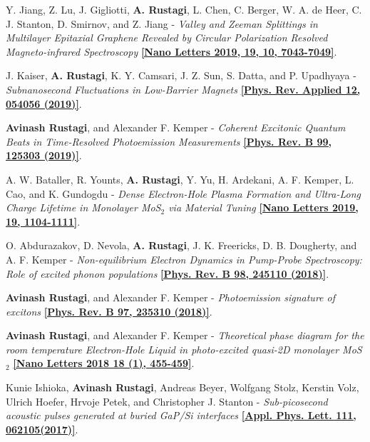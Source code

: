 \documentclass[12pt]{article}
\begin{document}
\begin{etaremune}
\item Y. Jiang, Z. Lu, J. Gigliotti, {\bf A. Rustagi}, L. Chen, C. Berger, W. A. de Heer, C. J. Stanton, D. Smirnov, and Z. Jiang - \textit{Valley and Zeeman Splittings in Multilayer Epitaxial Graphene Revealed by Circular Polarization Resolved Magneto-infrared Spectroscopy} \href{https://doi.org/10.1021/acs.nanolett.9b02505}{\bf [Nano Letters 2019, 19, 10, 7043-7049]}.

\item J. Kaiser, {\bf A. Rustagi}, K. Y. Camsari, J. Z. Sun, S. Datta, and P. Upadhyaya - \textit{Subnanosecond Fluctuations in Low-Barrier Magnets} \href{https://doi.org/10.1103/PhysRevApplied.12.054056}{\bf [Phys. Rev. Applied 12, 054056 (2019)]}.

    \item {\bf Avinash Rustagi}, and Alexander F. Kemper - \textit{Coherent Excitonic Quantum Beats in Time-Resolved Photoemission Measurements} \href{http://doi.org/10.1103/PhysRevB.99.125303}{\bf [Phys. Rev. B 99, 125303 (2019)]}.

    \item A. W. Bataller, R. Younts, {\bf A. Rustagi}, Y. Yu,  H. Ardekani, A. F. Kemper, L. Cao, and K. Gundogdu - \textit{Dense Electron-Hole Plasma Formation and Ultra-Long Charge Lifetime in Monolayer MoS$_2$ via Material Tuning }\href{http://doi.org/10.1021/acs.nanolett.8b04408}{\bf  [Nano Letters 2019, 19, 1104-1111]}.

    \item O. Abdurazakov, D. Nevola, {\bf A. Rustagi}, J. K. Freericks, D. B. Dougherty, and A. F. Kemper - \textit{Non-equilibrium Electron Dynamics in Pump-Probe Spectroscopy: Role of excited phonon populations} \href{http://doi.org/10.1103/PhysRevB.98.245110}{\bf  [Phys. Rev. B 98, 245110 (2018)]}.

    \item {\bf Avinash Rustagi}, and Alexander F. Kemper - \textit{Photoemission signature of excitons} \href{https://link.aps.org/doi/10.1103/PhysRevB.97.235310}{\bf [Phys. Rev. B 97, 235310 (2018)]}.

	\item {\bf Avinash Rustagi}, and Alexander F. Kemper - \textit{Theoretical phase diagram for the room temperature Electron-Hole Liquid in photo-excited quasi-2D monolayer MoS$_2$} \href{http://pubs.acs.org/doi/abs/10.1021/acs.nanolett.7b04377} {\bf [Nano Letters 2018 18 (1), 455-459]}.

	\item Kunie Ishioka, {\bf Avinash Rustagi}, Andreas Beyer, Wolfgang Stolz, Kerstin Volz, Ulrich Hoefer, Hrvoje Petek, and Christopher J. Stanton - \textit{Sub-picosecond acoustic pulses generated at buried GaP/Si interfaces} \href{http://aip.scitation.org/doi/full/10.1063/1.4997913}{\bf  [Appl. Phys. Lett. 111, 062105(2017)]}.
 

\end{etaremune}
\end{document}
